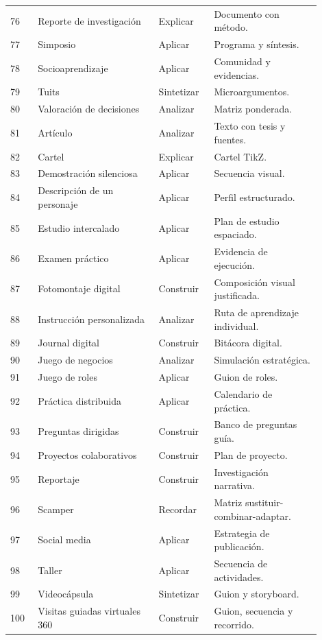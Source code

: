 \begin{longtable}{@{}p{0.08\linewidth}p{0.35\linewidth}p{0.16\linewidth}p{0.31\linewidth}@{}}
76 & Reporte de investigación & Explicar & Documento con método. \\
77 & Simposio & Aplicar & Programa y síntesis. \\
78 & Socioaprendizaje & Aplicar & Comunidad y evidencias. \\
79 & Tuits & Sintetizar & Microargumentos. \\
80 & Valoración de decisiones & Analizar & Matriz ponderada. \\
81 & Artículo & Analizar & Texto con tesis y fuentes. \\
82 & Cartel & Explicar & Cartel TikZ. \\
83 & Demostración silenciosa & Aplicar & Secuencia visual. \\
84 & Descripción de un personaje & Aplicar & Perfil estructurado. \\
85 & Estudio intercalado & Aplicar & Plan de estudio espaciado. \\
86 & Examen práctico & Aplicar & Evidencia de ejecución. \\
87 & Fotomontaje digital & Construir & Composición visual justificada. \\
88 & Instrucción personalizada & Analizar & Ruta de aprendizaje individual. \\
89 & Journal digital & Construir & Bitácora digital. \\
90 & Juego de negocios & Analizar & Simulación estratégica. \\
91 & Juego de roles & Aplicar & Guion de roles. \\
92 & Práctica distribuida & Aplicar & Calendario de práctica. \\
93 & Preguntas dirigidas & Construir & Banco de preguntas guía. \\
94 & Proyectos colaborativos & Construir & Plan de proyecto. \\
95 & Reportaje & Construir & Investigación narrativa. \\
96 & Scamper & Recordar & Matriz sustituir-combinar-adaptar. \\
97 & Social media & Aplicar & Estrategia de publicación. \\
98 & Taller & Aplicar & Secuencia de actividades. \\
99 & Videocápsula & Sintetizar & Guion y storyboard. \\
100 & Visitas guiadas virtuales 360 & Construir & Guion, secuencia y recorrido. \\
\bottomrule
\end{longtable}

